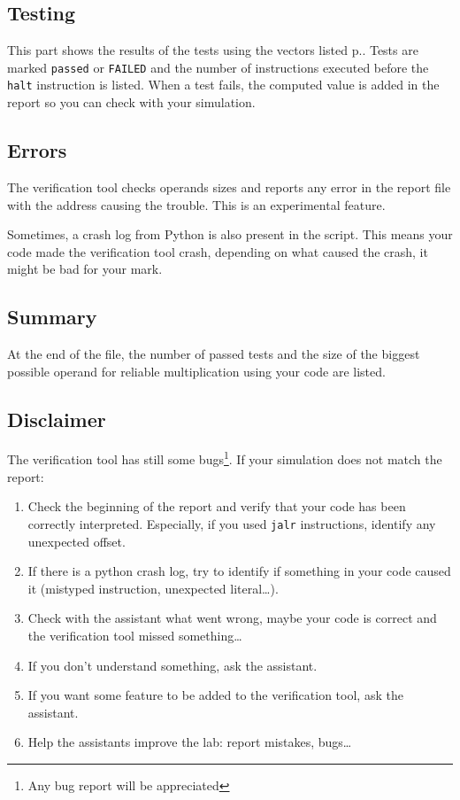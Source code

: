 \documentclass[10pt,a4paper]{article}
\theoremstyle{definition}%
\begin{document}
\subsection{Testing}
This part shows the results of the tests using the vectors listed p.\pageref{sec:vect}. Tests are marked \verb!passed! or \verb!FAILED! and the number of instructions executed before the \verb!halt! instruction is listed. When a test fails, the computed value is added in the report so you can check with your simulation.


\subsection{Errors}
The verification tool checks operands sizes and reports any error in the report file with the address causing the trouble. This is an experimental feature.

Sometimes, a crash log from Python is also present in the script. This means your code made the verification tool crash, depending on what caused the crash, it might be bad for your mark.

\subsection{Summary}
At the end of the file, the number of passed tests and the size of the biggest possible operand for reliable multiplication using your code are listed.


\subsection{Disclaimer}
The verification tool has still some bugs\footnote{Any bug report will be appreciated}. If your simulation does not match the report:
\begin{enumerate}
\item Check the beginning of the report and verify that your code has been correctly interpreted. Especially, if you used \verb!jalr! instructions, identify any unexpected offset.
\item If there is a python crash log, try to identify if something in your code caused it (mistyped instruction, unexpected literal\dots).
\item Check with the assistant what went wrong, maybe your code is correct and the verification tool missed something\dots
\item If you don't understand something, ask the assistant.
\item If you want some feature to be added to the verification tool, ask the assistant.
\item Help the assistants improve the lab: report mistakes, bugs\dots
\end{enumerate}
\end{document}
